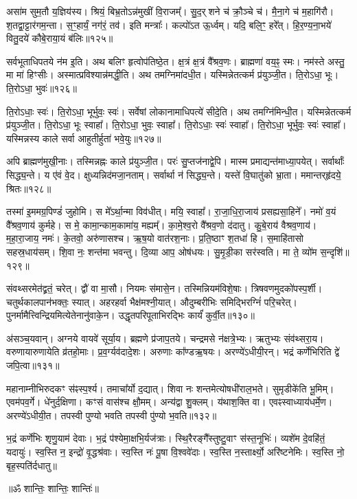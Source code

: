 असा॑म सुम॒तौ य॒ज्ञिय॑स्य। श्रियं॒ बिभ्र॒तोऽन्न॑मुखीं वि॒राजम्‌᳚। 
सु॒द॒र्‌शने च॑ क्रौ॒ञ्चे च॑। मै॒ना॒गे च॑ म॒हागि॑रौ। 
श॒तद्वा॒ट्टार॑गम॒न्ता। स॒ꣳ॒हार्यं॒ नग॑रं॒ तव॑। 
इति मन्त्राः᳚। कल्पो॑ऽत ऊ॒र्ध्वम्। यदि॒ बलि॒ꣳ॒ हरे᳚त्। 
हि॒र॒ण्य॒ना॒भये॑ वितु॒दये॑ कौबे॒राया॒यं ब॑लिः॥१२५॥


सर्वभूताधिपतये न॑म इ॒ति। अथ बलिꣳ हृत्वोप॑तिष्ठे॒त। 
क्ष॒त्रं क्ष॒त्रं वै᳚श्रव॒णः। ब्राह्मणा॑ वय॒ꣴ॒ स्मः। 
नम॑स्ते अस्तु॒ मा मा॑ हिꣳसीः। अस्मात्प्रविश्यान्न॑मद्धी॒ति। 
अथ तमग्निमा॑दधी॒त। यस्मिन्नेतत्कर्म प्र॑युञ्जी॒त। 
ति॒रोऽधा॒ भूः। ति॒रोऽधा॒ भुवः॑॥१२६॥


ति॒रोऽधाः॒ स्वः॑। ति॒रोऽधा॒ भूर्भुवः॒ स्वः॑। 
सर्वेषां लोकानामाधिपत्ये॑ सीदे॒ति। अथ तमग्नि॑मिन्धी॒त। 
यस्मिन्नेतत्कर्म प्र॑युञ्जी॒त। ति॒रोऽधा॒ भूः स्वाहा᳚। 
ति॒रोऽधा॒ भुवः॒ स्वाहा᳚। ति॒रोऽधाः॒ स्वः॑ स्वाहा᳚। 
ति॒रोऽधा॒ भूर्भुवः॒ स्वः॑ स्वाहा᳚। 
यस्मिन्नस्य काले सर्वा आहुतीर्\mbox{}हुता॑ भवे॒युः॥१२७॥


अपि ब्राह्मण॑मुखी॒नाः। तस्मिन्नह्नः काले प्र॑युञ्जी॒त। 
परः॑ सु॒प्तज॑नाद्वे॒पि। मास्म प्रमाद्यन्त॑माध्या॒पयेत्। 
सर्वार्थाः᳚ सिद्ध्य॒न्ते। य ए॑वं वे॒द। 
क्षुध्यन्निद॑म\-जा॒न\-ताम्। सर्वार्था न॑ सिद्ध्य॒न्ते। 
यस्ते॑ वि॒घातु॑को भ्रा॒ता। ममान्तर्‌हृ॑दये॒ श्रितः॥१२८॥


तस्मा॑ इ॒ममग्र॒पिण्डं॑ जुहोमि। स मे᳚ऽर्था॒न्मा विव॑धीत्। 
मयि॒ स्वाहा᳚। रा॒जा॒धि॒रा॒जाय॑ प्रसह्यसा॒हिने᳚। 
नमो॑ व॒यं वै᳚श्रव॒णाय॑ कुर्महे। स मे॒ कामा॒न्काम॒कामा॑य॒ मह्यम्‌᳚। 
का॒मे॒श्व॒रो वै᳚श्रव॒णो द॑दातु। कु॒बे॒राय॑ वैश्रव॒णाय॑। 
म॒हा॒रा॒जाय॒ नमः॑। के॒तवो॒ अरु॑णासश्च। 
ऋ॒ष॒यो वात॑रश॒नाः। प्र॒ति॒ष्ठाꣳ श॒तधा॑ हि। 
स॒माहि॑तासो सहस्र॒धाय॑सम्। शि॒वा नः॒ शन्त॑मा भवन्तु। 
दि॒व्या आप॒ ओष॑धयः। सु॒मृ॒डी॒का सर॑स्वति। 
मा ते॒ व्यो॑म स॒न्दृशि॑॥१२९॥\anuvakamend


संवथ्सरमेत॑द्व्रतं॒ चरेत्। द्वौ॑ वा मा॒सौ। 
नियमः स॑मासे॒न। तस्मिन्नियम॑\-विशे॒षाः। 
त्रिषवणमुदको॑पस्प॒र्शी। चतुर्थकालपान॑भक्तः॒ स्यात्। 
अहरहर्वा भैक्ष॑मश्नी॒यात्। औदुम्बरीभिः समिद्भिरग्निं॑ परि॒चरेत्। 
पुनर्मामैत्त्विन्द्रियमि\-त्येतेनानु॑वाके॒न। उद्धृतपरिपूताभि\-रद्भिः कार्यं॑ कुर्वी॒त॥१३०॥


अ॑सञ्च॒यवान्। अग्नये वायवे॑ सूर्या॒य। 
ब्रह्मणे प्र॑जाप॒तये। चन्द्रमसे न॑क्षत्रे॒भ्यः। 
ऋतुभ्यः संव॑थ्सरा॒य। वरुणायारुणायेति व्र॑तहो॒माः। 
प्र॒व॒र्ग्यव॑दादे॒शः। अरुणाः का᳚ण्डऋ॒षयः। 
अरण्ये॑\-ऽ\-धी\-यी॒रन्। भद्रं कर्णेभिरिति द्वे॑ जपि॒त्वा॥१३१॥


महानाम्नीभिरुदकꣳ स॑ꣴस्प॒र्श्य। तमाचा᳚र्यो द॒द्यात्। 
शिवा नः शन्तमेत्योषधी॑राल॒भते। सुमृडीके॑ति भू॒मिम्। 
एवम॑पव॒र्गे। धे॑नुर्द॒क्षिणा। कꣳसं वास॑श्च क्षौ॒मम्। 
अन्य॑द्वा शु॒क्लम्। य॑थाश॒क्ति वा। एवꣴस्वाध्याय॑धर्मे॒ण। 
अरण्ये॑ऽधीयी॒त। तपस्वी पुण्यो भवति तपस्वी पु॑ण्यो भ॒वति॥१३२॥\anuvakamend


भ॒द्रं कर्णे॑भिः शृणु॒याम॑ देवाः। भ॒द्रं प॑श्येमा॒क्षभि॒र्यज॑त्राः। 
स्थि॒रैरङ्गै᳚स्तुष्टु॒\-वाꣳ स॑स्त॒नूभिः॑। व्यशे॑म दे॒वहि॑तं॒ यदायुः॑। 
स्व॒स्ति न॒ इन्द्रो॑ वृ॒द्धश्र॑वाः। स्व॒स्ति नः॑ पू॒षा वि॒श्ववे॑दाः। 
स्व॒स्ति न॒स्तार्क्ष्यो॒ अरि॑ष्टनेमिः। स्व॒स्ति नो॒ बृह॒स्पति॑र्दधातु॥

\centerline{॥ॐ शान्तिः॒ शान्तिः॒ शान्तिः॑॥}
